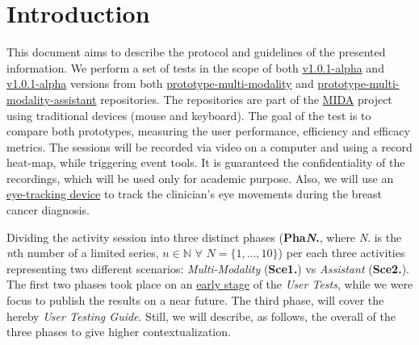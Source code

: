 
\section{Introduction}
\label{sec:sec001}

This document aims to describe the protocol and guidelines of the presented information. We perform a set of tests in the scope of both \hyperlink{https://github.com/MIMBCD-UI/prototype-multi-modality/releases/tag/v1.0.1-alpha}{v1.0.1-alpha} and \hyperlink{https://github.com/mida-project/prototype-multi-modality-assistant/releases/tag/v1.0.1-alpha}{v1.0.1-alpha} versions from both \hyperlink{https://github.com/MIMBCD-UI/prototype-multi-modality}{prototype-multi-modality} and \hyperlink{https://github.com/mida-project/prototype-multi-modality-assistant}{prototype-multi-modality-assistant} repositories. The repositories are part of the \hyperlink{https://mida-project.github.io/}{MIDA} project using traditional devices (mouse and keyboard). The goal of the test is to compare both prototypes, measuring the user performance, efficiency and efficacy metrics. The sessions will be recorded via video on a computer and using a record heat-map, while triggering event tools. It is guaranteed the confidentiality of the recordings, which will be used only for academic purpose. Also, we will use an \hyperlink{https://gaming.tobii.com/products/}{eye-tracking device} to track the clinician's eye movements during the breast cancer diagnosis.

Dividing the activity session into three distinct phases (\textbf{Pha\textit{N}.}, where \textit{N}. is the \textit{n}th number of a limited series, $n \in \mathbb{N}$ $\forall$ $N = \{1, ..., 10\}$) per each three activities representing two different scenarios: \textit{Multi-Modality} (\textbf{Sce1.}) vs \textit{Assistant} (\textbf{Sce2.}). The first two phases took place on an \hyperlink{https://github.com/MIMBCD-UI/testing-guide-breast/tree/master/samples/test_4}{early stage} of the \textit{User Tests}, while we were focus to publish the results on a near future. The third phase, will cover the hereby \textit{User Testing Guide}. Still, we will describe, as follows, the overall of the three phases to give higher contextualization.

